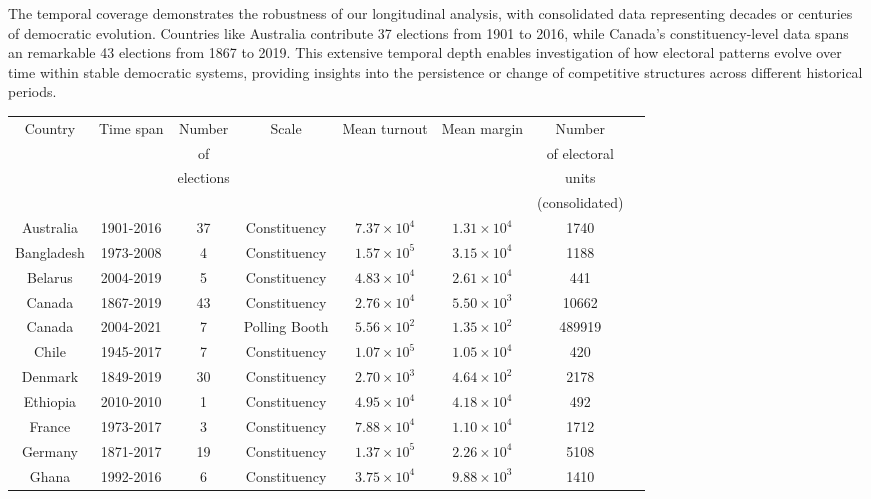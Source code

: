 The temporal coverage demonstrates the robustness of our longitudinal analysis, with consolidated data representing decades or centuries of democratic evolution. Countries like Australia contribute 37 elections from 1901 to 2016, while Canada's constituency-level data spans an remarkable 43 elections from 1867 to 2019. This extensive temporal depth enables investigation of how electoral patterns evolve over time within stable democratic systems, providing insights into the persistence or change of competitive structures across different historical periods.
\newpage
\begin{table}[H]
\centering
{\scriptsize
\begin{tabular}{|c|c|c|c|c|c|c|c|}
\hline
Country & Time span & Number & Scale    & Mean turnout & Mean margin  & Number \\ 
 &  & of  &  &  &  & of electoral \\ 
 &  & elections  &  &  &  & units \\ 
 &  &  &  &  &  & (consolidated) \\ \hline
Australia & 1901-2016 & 37 & Constituency & $7.37\times 10^{4}$ & $1.31\times 10^{4}$ & 1740\\ \hline
Bangladesh & 1973-2008 & 4 & Constituency & $1.57\times 10^{5}$ & $3.15\times 10^{4}$ & 1188\\ \hline
Belarus & 2004-2019 & 5 & Constituency & $4.83\times 10^{4}$ & $2.61\times 10^{4}$ & 441\\ \hline
Canada & 1867-2019 & 43 & Constituency & $2.76\times 10^{4}$ & $5.50\times 10^{3}$ & 10662\\ \hline
Canada & 2004-2021 & 7 & Polling Booth & $5.56\times 10^{2}$ & $1.35\times 10^{2}$ & 489919\\ \hline
Chile & 1945-2017 & 7 & Constituency & $1.07\times 10^{5}$ & $1.05\times 10^{4}$ & 420\\ \hline
Denmark & 1849-2019 & 30 & Constituency & $2.70\times 10^{3}$ & $4.64\times 10^{2}$ & 2178\\ \hline
Ethiopia & 2010-2010 & 1 & Constituency & $4.95\times 10^{4}$ & $4.18\times 10^{4}$ & 492\\ \hline
France & 1973-2017 & 3 & Constituency & $7.88\times 10^{4}$ & $1.10\times 10^{4}$ & 1712\\ \hline
Germany & 1871-2017 & 19 & Constituency & $1.37\times 10^{5}$ & $2.26\times 10^{4}$ & 5108\\ \hline
Ghana & 1992-2016 & 6 & Constituency & $3.75\times 10^{4}$ & $9.88\times 10^{3}$ & 1410\\ \hline

\end{tabular}}
\end{table}
